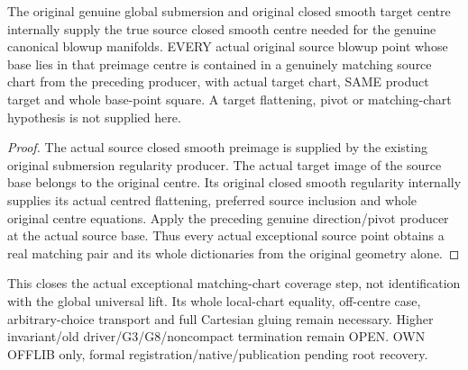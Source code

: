 \begin{theorem}
\label{hir:submersion-adapted-blowup-cover-whole-exceptional}
\leanok
{}

The original genuine global submersion and original closed smooth target centre internally supply the true source closed smooth centre needed for the genuine canonical blowup manifolds. EVERY actual original source blowup point whose base lies in that preimage centre is contained in a genuinely matching source chart from the preceding producer, with actual target chart, SAME product target and whole base-point square. A target flattening, pivot or matching-chart hypothesis is not supplied here.
\end{theorem}
\begin{proof}
The actual source closed smooth preimage is supplied by the existing original submersion regularity producer. The actual target image of the source base belongs to the original centre. Its original closed smooth regularity internally supplies its actual centred flattening, preferred source inclusion and whole original centre equations. Apply the preceding genuine direction/pivot producer at the actual source base. Thus every actual exceptional source point obtains a real matching pair and its whole dictionaries from the original geometry alone.
\end{proof}

This closes the actual exceptional matching-chart coverage step, not identification with the global universal lift. Its whole local-chart equality, off-centre case, arbitrary-choice transport and full Cartesian gluing remain necessary. Higher invariant/old driver/G3/G8/noncompact termination remain OPEN. OWN OFFLIB only, formal registration/native/publication pending root recovery.
